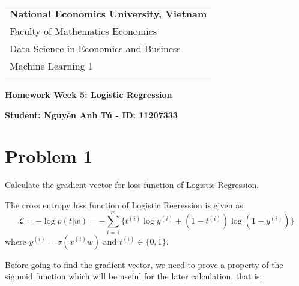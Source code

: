 \documentclass[a4paper, 12pt]{article}  %
\begin{document}
\thispagestyle{empty} %

\begin{tabular}{p{12.5cm}} %
{\large \bf National Economics University, Vietnam} \\
Faculty of Mathematics Economics \\ Data Science in Economics and Business  \\ Machine Learning 1\\
\hline %
\\
\end{tabular} %

\vspace*{0.3cm} %

\begin{center} %
	{\Large \bf Homework Week 5: Logistic Regression} %
	\vspace{2mm}
	
	{\bf Student: Nguyễn Anh Tú - ID: 11207333} %
\end{center}  

\section{Problem 1}

Calculate the gradient vector for loss function of Logistic Regression.

The cross entropy loss function of Logistic Regression is given as:
\[\mathcal{L} = -\log p(t|w) = -\sum^m_{i=1}\{t^{(i)} \log y^{(i)} + (1 - t^{(i)}) \log (1 - y^{(i)})\}\]
where $y^{(i)} = \sigma(x^{(i)} w)$ and $t^{(i)} \in \{0, 1\}$. 

Before going to find the gradient vector, we need to prove a property of the sigmoid function which will be useful for the later calculation, that is:
\end{document}

